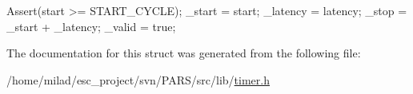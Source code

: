 \begin{DoxyCode}
                                                     {
                Assert(start >= START_CYCLE);
                _start = start;
            _latency = latency;
                _stop = _start + _latency;
            _valid = true;
        }
\end{DoxyCode}


The documentation for this struct was generated from the following file:\begin{DoxyCompactItemize}
\item 
/home/milad/esc\_\-project/svn/PARS/src/lib/\hyperlink{lib_2timer_8h}{timer.h}\end{DoxyCompactItemize}
